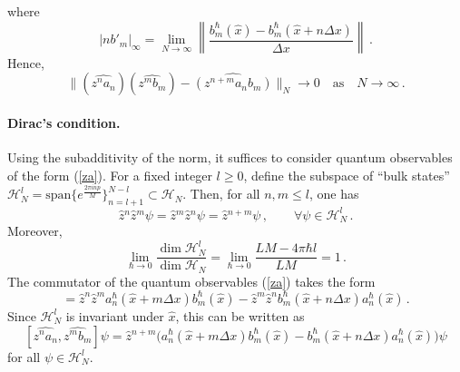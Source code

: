 \documentclass[12pt,a4paper]{article}
\numberwithin{equation}{section}
\theoremstyle{theorem}
\theoremstyle{remark}
\newcommand{\hh}{\mathcal{H}}
\begin{document}
             where
             $$
             |nb'_m|_\infty=\lim_{N\to \infty}\left\|\frac{b_m^\hbar(\hat x)-b_m^\hbar(\hat x+n\Delta x) }{\Delta x}\right\|\,.
             $$
             Hence,
             $$
              \|(\widehat{z^na_n} ) (\widehat{z^mb_m})- \widehat{(z^{n+m}a_nb_m)}\|_N  \to 0\quad \mbox{as}\quad N\to\infty\,.  
              $$
              
 \paragraph{Dirac's condition.} Using the subadditivity of the norm, it suffices to consider quantum observables of the form (\ref{za}). 
 For a fixed integer $l\geq 0$, define the subspace of ``bulk states'' $\hh_{N}^l=\mathrm{span}\big\{e^{\frac{2\pi i n p}{M}}\big\}_{n=l+1}^{N-l}\subset \hh_N$.  Then, for all $n,m\leq l$, one has 
 \begin{equation}
    \hat{z}{}^n\hat{z}{}^m\psi= \hat{z}{}^m\hat{z}{}^n\psi= \hat{z}{}^{n+m}\psi\,,   \qquad \forall \psi\in \hh_N^l\,.
    \end{equation}
 Moreover,
 \begin{equation}
 \lim_{\hbar \rightarrow 0}\frac{\dim\hh_N^l}{\dim\hh_N}=\lim_{\hbar \rightarrow 0}\frac{LM-4\pi \hbar l}{LM}=1\,.
 \end{equation}
 The commutator of the quantum observables (\ref{za}) takes the form
\begin{equation}
     [\widehat{z^na_n}, \widehat{z^mb_m}]=\hat z^n\hat z^ma_n^\hbar(\hat x+m\Delta x)b_m^\hbar(\hat x)-\hat z^m\hat z^nb_m^\hbar(\hat x+n\Delta x)a_n^\hbar(\hat x)\,. 
\end{equation}
 Since $\hh^l_N$ is invariant under $\hat x$, this can be written as
 \begin{equation}\label{com}
     [\widehat{z^na_n}, \widehat{z^mb_m}]\psi= \hat{z}{}^{n+m}\big(a_n^\hbar(\hat x+m\Delta x)b_m^\hbar(\hat x)-b_m^\hbar(\hat x+n\Delta x)a_n^\hbar(\hat x)  \big)\psi
     \end{equation}
   for all   $\psi\in \hh_N^l $. 
   
\end{document}
